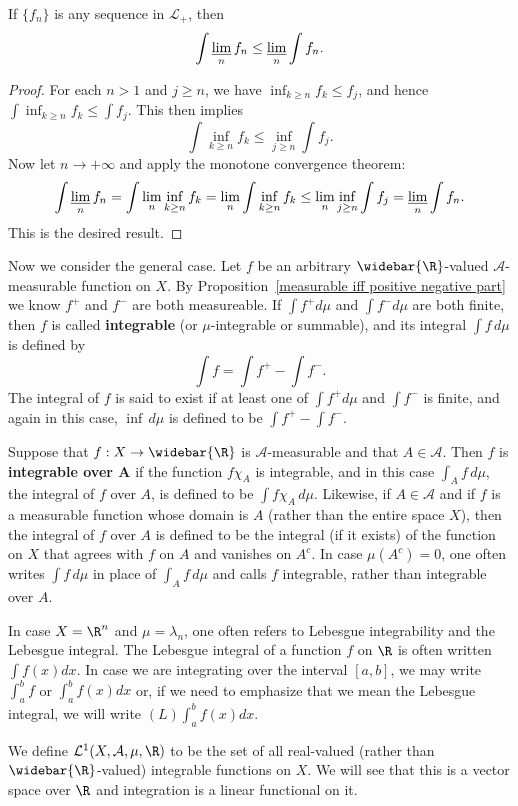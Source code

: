 \begin{proposition}
If $\{f_n\}$ is any sequence in $\mathcal{L}_+$, then
\[\int\varliminf_n f_n\leq\varliminf_n\int f_n.\]
\end{proposition}
\begin{proof}
For each $n>1$ and $j\geq n$, we have $\inf_{k\geq n}f_k\leq f_j$, and hence $\int\inf_{k\geq n}f_k\leq\int f_j$. This then implies
\[\int\inf_{k\geq n}f_k\leq\inf_{j\geq n}\int f_j.\]
Now let $n\to+\infty$ and apply the monotone convergence theorem:
\[\int\varliminf_nf_n=\int\lim_{n}\inf_{k\geq n}f_k=\lim_n\int\inf_{k\geq n}f_k\leq\lim_n\inf_{j\geq n}\int f_j=\varliminf_n\int f_n.\]
This is the desired result.
\end{proof}
Now we consider the general case. Let $f$ be an arbitrary $\widebar{\R}$-valued $\mathcal{A}$-measurable function on $X$. By Proposition~\ref{measurable iff positive negative part} we know $f^+$ and $f^-$ are both measureable. If $\int f^+d\mu$ and $\int f^-d\mu$ are both finite, then $f$ is called \textbf{integrable} (or $\mu$-integrable or summable), and its integral $\int f\,d\mu$ is defined by
\[\int f=\int f^+-\int f^-.\]
The integral of $f$ is said to exist if at least one of $\int f^+d\mu$ and $\int f^-$ is finite, and again in this case, $\inf\,d\mu$ is defined to be $\int f^+-\int f^-$.\par
Suppose that $f:X\to\widebar{\R}$ is $\mathcal{A}$-measurable and that $A\in\mathcal{A}$. Then $f$ is \textbf{integrable over $\bm{A}$} if the function $f\chi_A$ is integrable, and in this case $\int_Af\,d\mu$, the integral of $f$ over $A$, is defined to be $\int f\chi_A\,d\mu$. Likewise, if $A\in\mathcal{A}$ and if $f$ is a measurable function whose domain is $A$ (rather than the entire space $X$), then the integral of $f$ over $A$ is defined to be the integral (if it exists) of the function on $X$ that agrees with $f$ on $A$ and vanishes on $A^c$. In case $\mu(A^c)=0$, one often writes $\int f\,d\mu$ in place of $\int_A f\,d\mu$ and calls $f$ integrable, rather than integrable over $A$.\par
In case $X=\R^n$ and $\mu=\lambda_n$, one often refers to Lebesgue integrability and the Lebesgue integral. The Lebesgue integral of a function $f$ on $\R$ is often written $\int f(x)dx$. In case we are integrating over the interval $[a,b]$, we may write $\int_a^b f$ or $\int_a^b f(x)dx$ or, if we need to emphasize that we mean the Lebesgue integral, we will write $(L)\int_a^b f(x)dx$.\par
We define $\mathcal{L}^1(X,\mathcal{A},\mu,\R)$ to be the set of all real-valued (rather than $\widebar{\R}$-valued) integrable functions on $X$. We will see that this is a vector space over $\R$ and integration is a linear functional on it.
